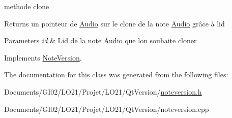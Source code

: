methode clone 

\begin{DoxyReturn}{Returns}
un pointeur de \hyperlink{class_audio}{Audio} sur le clone de la note \hyperlink{class_audio}{Audio} grâce à l\textquotesingle{}id 
\end{DoxyReturn}

\begin{DoxyParams}{Parameters}
{\em id} & L\textquotesingle{}id de la note \hyperlink{class_audio}{Audio} que l\textquotesingle{}on souhaite cloner \\
\hline
\end{DoxyParams}


Implements \hyperlink{class_note_version_a7eb23a52291ec623b9bc1b6fe3e86c5a}{Note\+Version}.



The documentation for this class was generated from the following files\+:\begin{DoxyCompactItemize}
\item 
Documents/\+G\+I02/\+L\+O21/\+Projet/\+L\+O21/\+Qt\+Version/\hyperlink{noteversion_8h}{noteversion.\+h}\item 
Documents/\+G\+I02/\+L\+O21/\+Projet/\+L\+O21/\+Qt\+Version/noteversion.\+cpp\end{DoxyCompactItemize}
